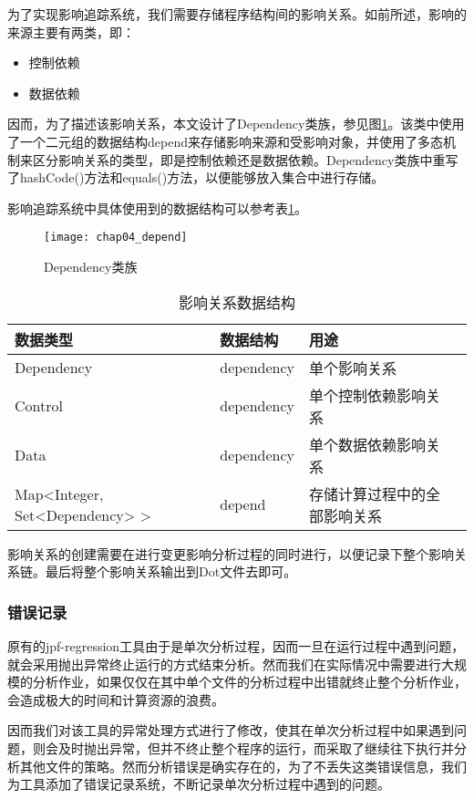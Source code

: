 为了实现影响追踪系统，我们需要存储程序结构间的影响关系。如前所述，影响的来源主要有两类，即：
\begin{itemize}
	\item 控制依赖
	\item 数据依赖
\end{itemize}

因而，为了描述该影响关系，本文设计了Dependency类族，参见图\ref {class_depend}。该类中使用了一个二元组的数据结构depend来存储影响来源和受影响对象，并使用了多态机制来区分影响关系的类型，即是控制依赖还是数据依赖。Dependency类族中重写了hashCode()方法和equals()方法，以便能够放入集合中进行存储。

影响追踪系统中具体使用到的数据结构可以参考表\ref {track_data}。

\begin{figure}[H]
	\centering
	\texttt{[image: chap04\_depend]}
	\caption {Dependency类族}
	\label {class_depend}	
\end{figure}

\begin{table}
	\caption{影响关系数据结构}
	\label{track_data}
	\centering
	\begin{tabular}{lllc}
		\toprule[1.5pt]
		{\heiti 数据类型} &{\heiti 数据结构} & {\heiti 用途} \\\midrule[1pt]
		Dependency & dependency & 单个影响关系 \\
		Control & dependency & 单个控制依赖影响关系 \\
		Data & dependency & 单个数据依赖影响关系 \\
		Map<Integer, Set<Dependency> > & depend & 存储计算过程中的全部影响关系\\
		\bottomrule[1.5pt]
	\end{tabular}
\end{table}

影响关系的创建需要在进行变更影响分析过程的同时进行，以便记录下整个影响关系链。最后将整个影响关系输出到Dot文件去即可。


\subsubsection{错误记录}

原有的jpf-regression工具由于是单次分析过程，因而一旦在运行过程中遇到问题，就会采用抛出异常终止运行的方式结束分析。然而我们在实际情况中需要进行大规模的分析作业，如果仅仅在其中单个文件的分析过程中出错就终止整个分析作业，会造成极大的时间和计算资源的浪费。

因而我们对该工具的异常处理方式进行了修改，使其在单次分析过程中如果遇到问题，则会及时抛出异常，但并不终止整个程序的运行，而采取了继续往下执行并分析其他文件的策略。然而分析错误是确实存在的，为了不丢失这类错误信息，我们为工具添加了错误记录系统，不断记录单次分析过程中遇到的问题。

